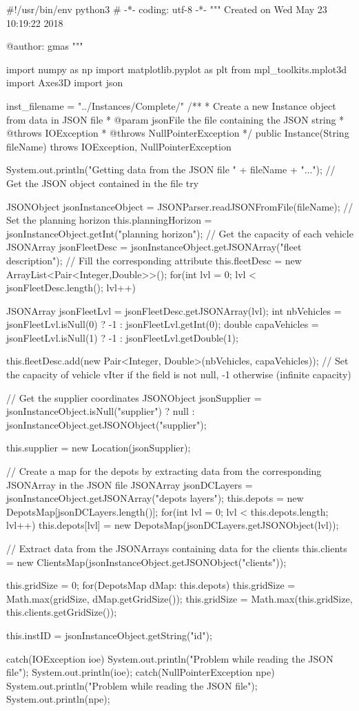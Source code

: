 #!/usr/bin/env python3
# -*- coding: utf-8 -*-
"""
Created on Wed May 23 10:19:22 2018

@author: gmas
"""

import numpy as np
import matplotlib.pyplot as plt
from mpl_toolkits.mplot3d import Axes3D
import json

inst_filename = "../Instances/Complete/"
	/**
	 * Create a new Instance object from data in JSON file
	 * @param jsonFile	the file containing the JSON string
	 * @throws IOException
	 * @throws NullPointerException
	 */
	public Instance(String fileName) throws IOException, NullPointerException {
		System.out.println("Getting data from the JSON file " + fileName + "...");
		// Get the JSON object contained in the file
		try {
			JSONObject jsonInstanceObject = JSONParser.readJSONFromFile(fileName);
			// Set the planning horizon
			this.planningHorizon = jsonInstanceObject.getInt("planning horizon");
			// Get the capacity of each vehicle
			JSONArray jsonFleetDesc = jsonInstanceObject.getJSONArray("fleet description");
			// Fill the corresponding attribute
			this.fleetDesc = new ArrayList<Pair<Integer,Double>>();
			for(int lvl = 0; lvl < jsonFleetDesc.length(); lvl++) {
				JSONArray jsonFleetLvl = jsonFleetDesc.getJSONArray(lvl);
				int nbVehicles = jsonFleetLvl.isNull(0) ? -1 : jsonFleetLvl.getInt(0);
				double capaVehicles = jsonFleetLvl.isNull(1) ? -1 : jsonFleetLvl.getDouble(1);

				this.fleetDesc.add(new Pair<Integer, Double>(nbVehicles, capaVehicles)); // Set the capacity of vehicle vIter if the field is not null, -1 otherwise (infinite capacity)
			}
			// Get the supplier coordinates
			JSONObject jsonSupplier = jsonInstanceObject.isNull("supplier") ? null : jsonInstanceObject.getJSONObject("supplier");

			this.supplier = new Location(jsonSupplier);

			// Create a map for the depots by extracting data from the corresponding JSONArray in the JSON file
			JSONArray jsonDCLayers = jsonInstanceObject.getJSONArray("depots layers");
			this.depots = new DepotsMap[jsonDCLayers.length()];
			for(int lvl = 0; lvl < this.depots.length; lvl++) {
				this.depots[lvl] = new DepotsMap(jsonDCLayers.getJSONObject(lvl));
			}

			// Extract data from the JSONArrays containing data for the clients
			this.clients = new ClientsMap(jsonInstanceObject.getJSONObject("clients"));

			this.gridSize = 0;
			for(DepotsMap dMap: this.depots) {
				this.gridSize = Math.max(gridSize, dMap.getGridSize());
			}
			this.gridSize = Math.max(this.gridSize, this.clients.getGridSize());

			this.instID = jsonInstanceObject.getString("id");
		}
		catch(IOException ioe) {
			System.out.println("Problem while reading the JSON file");
			System.out.println(ioe);
		}
		catch(NullPointerException npe) {
			System.out.println("Problem while reading the JSON file");
			System.out.println(npe);
		}
	}
